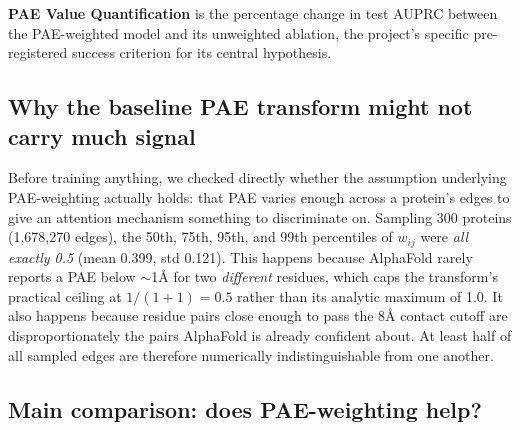 \documentclass[10pt,conference,a4paper]{IEEEtran}
\begin{document}
\textbf{PAE Value Quantification} is the percentage change in test AUPRC between the PAE-weighted model and its unweighted ablation, the project's specific pre-registered success criterion for its central hypothesis.

\subsection{Why the baseline PAE transform might not carry much signal}
\label{sec:saturation}

Before training anything, we checked directly whether the assumption underlying PAE-weighting actually holds: that PAE varies enough across a protein's edges to give an attention mechanism something to discriminate on. Sampling 300 proteins (1{,}678{,}270 edges), the 50th, 75th, 95th, and 99th percentiles of $w_{ij}$ were \textit{all exactly 0.5} (mean 0.399, std 0.121). This happens because AlphaFold rarely reports a PAE below $\sim$1\r{A} for two \textit{different} residues, which caps the transform's practical ceiling at $1/(1+1)=0.5$ rather than its analytic maximum of 1.0. It also happens because residue pairs close enough to pass the 8\r{A} contact cutoff are disproportionately the pairs AlphaFold is already confident about. At least half of all sampled edges are therefore numerically indistinguishable from one another.

\subsection{Main comparison: does PAE-weighting help?}

\begin{table}[!ht]
\centering
\caption{Training- and test-set results, all models (train n=34{,}732; test n=6{,}771).}
\label{tab:main-results}
\end{table}
\end{document}

